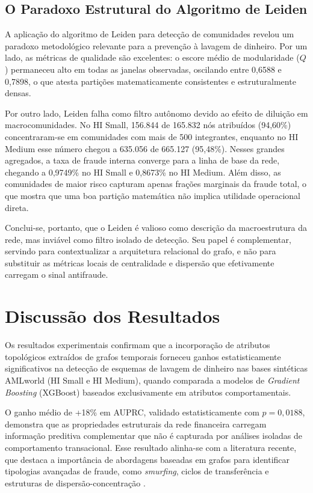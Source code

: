 \documentclass[titlepage,a4paper,oneside,onecolumn,12pt]{report}
\begin{document}
\subsection{O Paradoxo Estrutural do Algoritmo de Leiden}
\label{subsec:paradoxo_leiden}

A aplicação do algoritmo de Leiden para detecção de comunidades revelou um paradoxo metodológico relevante para a prevenção à lavagem de dinheiro. Por um lado, as métricas de qualidade são excelentes: o escore médio de modularidade ($Q$) permaneceu alto em todas as janelas observadas, oscilando entre 0,6588 e 0,7898, o que atesta partições matematicamente consistentes e estruturalmente densas.

Por outro lado, Leiden falha como filtro autônomo devido ao efeito de diluição em macrocomunidades. No HI Small, 156.844 de 165.832 nós atribuídos (94,60\%) concentraram-se em comunidades com mais de 500 integrantes, enquanto no HI Medium esse número chegou a 635.056 de 665.127 (95,48\%). Nesses grandes agregados, a taxa de fraude interna converge para a linha de base da rede, chegando a 0,9749\% no HI Small e 0,8673\% no HI Medium. Além disso, as comunidades de maior risco capturam apenas frações marginais da fraude total, o que mostra que uma boa partição matemática não implica utilidade operacional direta.

Conclui-se, portanto, que o Leiden é valioso como descrição da macroestrutura da rede, mas inviável como filtro isolado de detecção. Seu papel é complementar, servindo para contextualizar a arquitetura relacional do grafo, e não para substituir as métricas locais de centralidade e dispersão que efetivamente carregam o sinal antifraude.

\section{Discussão dos Resultados}

Os resultados experimentais confirmam que a incorporação de atributos topológicos extraídos de grafos temporais forneceu ganhos estatisticamente significativos na detecção de esquemas de lavagem de dinheiro nas bases sintéticas AMLworld (HI Small e HI Medium), quando comparada a modelos de \textit{Gradient Boosting} (XGBoost) baseados exclusivamente em atributos comportamentais.

O ganho médio de +18\% em AUPRC, validado estatisticamente com $p = 0{,}0188$, demonstra que as propriedades estruturais da rede financeira carregam informação preditiva complementar que não é capturada por análises isoladas de comportamento transacional. Esse resultado alinha-se com a literatura recente, que destaca a importância de abordagens baseadas em grafos para identificar tipologias avançadas de fraude, como \textit{smurfing}, ciclos de transferência e estruturas de dispersão-concentração \cite{cheng2025graph,baigabyl2025using}.
\end{document}
